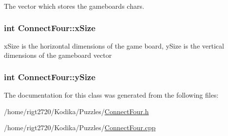 The vector which stores the gameboards chars. 

\hypertarget{classConnectFour_a9ebcc46eaaac1805eab8b90925f83a63}{
\subsubsection[{x\-Size}]{\setlength{\rightskip}{0pt plus 5cm}int Connect\-Four\-::x\-Size\hspace{0.3cm}{\ttfamily [private]}}}\label{classConnectFour_a9ebcc46eaaac1805eab8b90925f83a63}
x\-Size is the horizontal dimensions of the game board, y\-Size is the vertical dimensions of the gameboard vector \hypertarget{classConnectFour_acd39fbfa19a81ab05e7aae3ac51e9ed8}{
\subsubsection[{y\-Size}]{\setlength{\rightskip}{0pt plus 5cm}int Connect\-Four\-::y\-Size\hspace{0.3cm}{\ttfamily [private]}}}\label{classConnectFour_acd39fbfa19a81ab05e7aae3ac51e9ed8}


The documentation for this class was generated from the following files\-:\begin{DoxyCompactItemize}
\item 
/home/rigt2720/\-Kodika/\-Puzzles/\hyperlink{ConnectFour_8h}{Connect\-Four.\-h}\item 
/home/rigt2720/\-Kodika/\-Puzzles/\hyperlink{ConnectFour_8cpp}{Connect\-Four.\-cpp}\end{DoxyCompactItemize}

